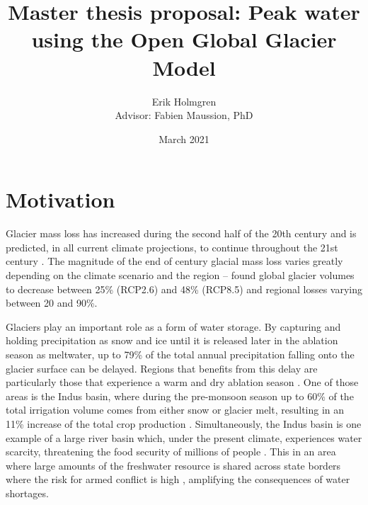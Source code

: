 \documentclass[12pt, a4paper]{article}
\author{Erik Holmgren \\ Advisor: Fabien Maussion, PhD}
\title{Master thesis proposal: Peak water using the Open Global Glacier Model}
\date{March 2021}
\begin{document}
\maketitle
\noindent
\section{Motivation}
Glacier mass loss has increased during the second half of the 20th century
\parencite{vaughanObservationsCryosphere2013} and is predicted, in all current
climate projections, to continue throughout the 21st century
\parencite{ipccClimateChange20142014}. The magnitude of the end of century
glacial mass loss varies greatly depending on the climate scenario and the
region -- \textcite{hussNewModelGlobal2015} found global glacier volumes to
decrease between 25\% (RCP2.6) and 48\% (RCP8.5) and regional losses varying
between 20 and 90\%.




Glaciers play an important role as a form of water storage. By capturing and
holding precipitation as snow and ice until it is released later in the ablation
season as meltwater, up to 79\% of the total annual precipitation falling onto
the glacier surface can be delayed. Regions that benefits from this delay are
particularly those that experience a warm and dry ablation season
\parencite{kaserContributionPotentialGlaciers2010}. One of those areas is the
Indus basin, where during the pre-monsoon season up to 60\% of the total
irrigation volume comes from either snow or glacier melt, resulting in an 11\%
increase of the total crop production
\parencite{biemansImportanceSnowGlacier2019}. Simultaneously, the Indus basin is
one example of a large river basin which, under the present climate, experiences
water scarcity, threatening the food security of millions of people
\parencite{kummuClimatedrivenInterannualVariability2014}. This in an area where
large amounts of the freshwater resource is shared across state borders where
the risk for armed conflict is high
\parencite{schleussnerArmedconflictRisksEnhanced2016,
pritchardAsiaShrinkingGlaciers2019}, amplifying the consequences of water
shortages. 
\end{document}
